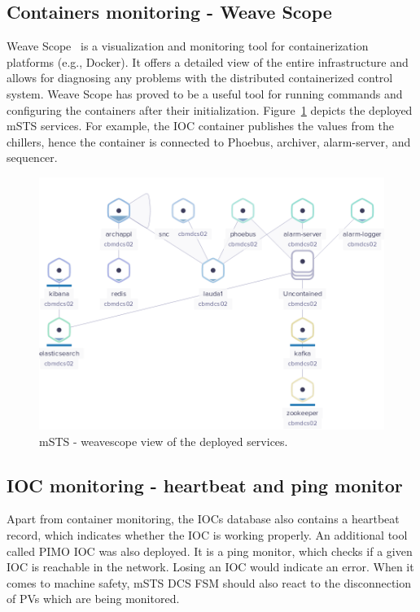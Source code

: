 \subsection{Containers monitoring - Weave Scope}

Weave Scope~\cite{weavescope} is a visualization and monitoring tool for containerization platforms (e.g., Docker). It offers a detailed view of the entire infrastructure and allows for diagnosing any problems with the distributed containerized control system. Weave Scope has proved to be a useful tool for running commands and configuring the containers after their initialization. Figure~\ref{fig_weave} depicts the deployed \gls{mSTS} services. For example, the \gls{IOC} container publishes the values from the chillers, hence the container is connected to Phoebus, archiver, alarm-server, and sequencer.
\begin{figure}[!h]
\centering
\includegraphics[width=0.85\columnwidth]{Chapter6/DCS/images/weave.png}
\caption{mSTS - weavescope view of the deployed services.}
\label{fig_weave}
\end{figure}
\subsection{IOC monitoring - heartbeat and ping monitor}
Apart from container monitoring, the \glspl{IOC} database also contains a heartbeat record, which indicates whether the \gls{IOC} is working properly. An additional tool called PIMO \gls{IOC} was also deployed. It is a ping monitor, which checks if a given \gls{IOC} is reachable in the network. Losing an \gls{IOC} would indicate an error. When it comes to machine safety, \gls{mSTS} \gls{DCS} \gls{FSM} should also react to the disconnection of \glspl{PV} which are being monitored.
